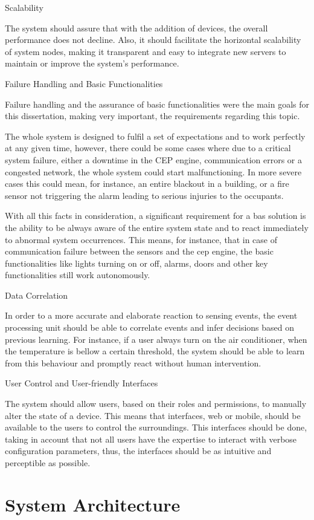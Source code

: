 \begin{Paragraph}{Scalability}

The system should assure that with the addition of devices, the overall performance does not decline. Also, it should facilitate the horizontal scalability of system nodes, making it transparent and easy to integrate new servers to maintain or improve the system's performance.

\end{Paragraph}

\begin{Paragraph}{Failure Handling and Basic Functionalities}
	
Failure handling and the assurance of basic functionalities were the main goals for this dissertation, making very important, the requirements regarding this topic.

The whole system is designed to fulfil a set of expectations and to work perfectly at any given time, however, there could be some cases where due to a critical system failure, either a downtime in the CEP engine, communication errors or a congested network, the whole system could start malfunctioning. In more severe cases this could mean, for instance, an entire blackout in a building, or a fire sensor not triggering the alarm leading to serious injuries to the occupants.

With all this facts in consideration, a significant requirement for a \ac{bas} solution is the ability to be always aware of the entire system state and to react immediately to abnormal system occurrences. This means, for instance, that in case of communication failure between the sensors and the \ac{cep} engine, the basic functionalities like lights turning on or off, alarms, doors and other key functionalities still work autonomously.
\end{Paragraph}

\begin{Paragraph}{Data Correlation}

In order to a more accurate and elaborate reaction to sensing events, the event processing unit should be able to correlate events and infer decisions based on previous learning. For instance, if a user always turn on the air conditioner, when the temperature is bellow a certain threshold, the system should be able to learn from this behaviour and promptly react without human intervention.

\end{Paragraph}

\begin{Paragraph}{User Control and User-friendly Interfaces}
	
The system should allow users, based on their roles and permissions, to manually alter the state of a device. This means that interfaces, web or mobile, should be available to the users to control the surroundings. This interfaces should be done, taking in account that not all users have the expertise to interact with verbose configuration parameters, thus, the interfaces should be as intuitive and perceptible as possible.
	
\end{Paragraph}


\section{System Architecture}
\label{Architecture:Architecture}



